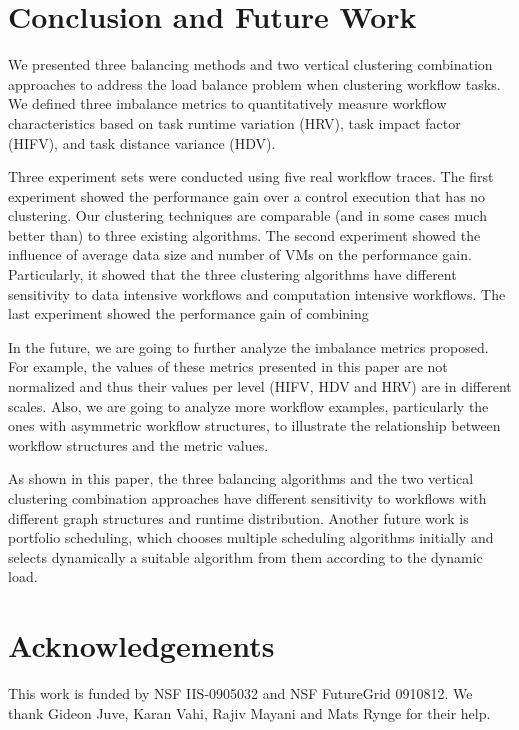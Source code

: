 \section{Conclusion and Future Work}

We presented three balancing methods and two vertical clustering combination approaches to address the load balance problem when clustering workﬂow tasks. We deﬁned three imbalance metrics to quantitatively measure workﬂow characteristics based on task runtime variation (HRV), task impact factor (HIFV), and task distance variance (HDV).

Three experiment sets were conducted using five real workflow traces. The first experiment showed the performance gain over a control execution that has no clustering. Our clustering techniques are comparable (and in some cases much better than) to three existing algorithms. The second experiment showed the influence of average data size and number of VMs on the performance gain. Particularly, it showed that the three clustering algorithms have different sensitivity to data intensive workflows and computation intensive workflows. The last experiment showed the performance gain of combining 

In the future, we are going to further analyze the imbalance metrics proposed. For example, the values of these metrics presented in this paper are not normalized and thus their values per level (HIFV, HDV and HRV) are in different scales. Also, we are going to analyze more workflow examples, particularly the ones with asymmetric workflow structures, to illustrate the relationship between workflow structures and the metric values. 

As shown in this paper, the three balancing algorithms and the two vertical clustering combination approaches have different sensitivity to workflows with different graph structures and runtime distribution. Another future work is portfolio scheduling, which chooses multiple scheduling algorithms initially and selects dynamically a suitable algorithm from them according to the dynamic load. 

\section{Acknowledgements}
This work is funded by NSF IIS-0905032 and NSF FutureGrid 0910812. We thank Gideon Juve, Karan Vahi, Rajiv Mayani and Mats Rynge for their help. 